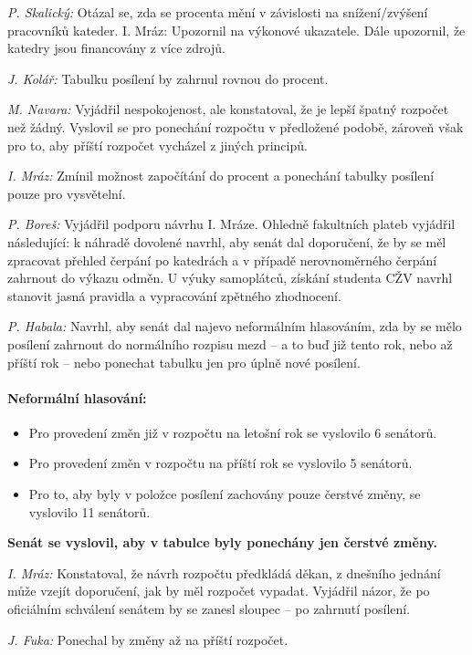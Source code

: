 \documentclass[a4paper,12pt,notitlepage,oneside]{article}
\begin{document}
\textit{P. Skalický:} Otázal se, zda se procenta mění v závislosti na snížení/zvýšení pracovníků kateder. I. Mráz: Upozornil na výkonové ukazatele. Dále upozornil, že katedry jsou financovány z více zdrojů.

\textit{J. Kolář:} Tabulku posílení by zahrnul rovnou do procent.

\textit{M. Navara:} Vyjádřil nespokojenost, ale konstatoval, že je lepší špatný rozpočet než žádný. Vyslovil se pro ponechání rozpočtu v předložené podobě, zároveň však pro to, aby příští rozpočet vycházel z jiných principů.

\textit{I. Mráz:} Zmínil možnost započítání do procent a ponechání tabulky posílení pouze pro vysvětelní.

\textit{P. Boreš:} Vyjádřil podporu návrhu I. Mráze. Ohledně fakultních plateb vyjádřil následující: k náhradě dovolené navrhl, aby senát dal doporučení, že by se měl zpracovat přehled čerpání po katedrách a v případě nerovnoměrného čerpání zahrnout do výkazu odměn. U výuky samoplátců, získání studenta CŽV navrhl stanovit jasná pravidla a vypracování zpětného zhodnocení.

\textit{P. Habala:} Navrhl, aby senát dal najevo neformálním hlasováním, zda by se mělo posílení zahrnout do normálního rozpisu mezd – a to buď již tento rok, nebo až příští rok – nebo ponechat tabulku jen pro úplně nové posílení.

\newpage\paragraph{Neformální hlasování:}
\begin{itemize}
\item Pro provedení změn již v rozpočtu na letošní rok se vyslovilo 6 senátorů.
\item Pro provedení změn v rozpočtu na příští rok se vyslovilo 5 senátorů.
\item Pro to, aby byly v položce posílení zachovány pouze čerstvé změny, se vyslovilo 11 senátorů. 
\end{itemize}
\textbf{Senát se vyslovil, aby v tabulce byly ponechány jen čerstvé změny.}

\bigskip\bigskip

\textit{I. Mráz:} Konstatoval, že návrh rozpočtu předkládá děkan, z dnešního jednání může vzejít doporučení, jak by měl rozpočet vypadat. Vyjádřil názor, že po oficiálním schválení senátem by se zanesl sloupec – po zahrnutí posílení.

\textit{J. Fuka:} Ponechal by změny až na příští rozpočet.
\end{document}
